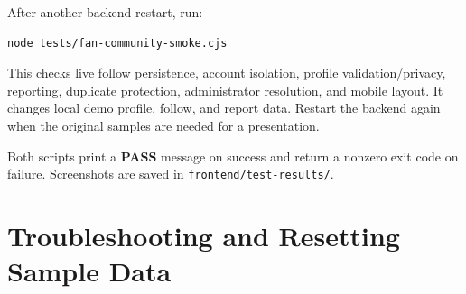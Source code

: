\documentclass[11pt]{report}
\begin{document}
After another backend restart, run:
\begin{samepage}
\begin{verbatim}
node tests/fan-community-smoke.cjs
\end{verbatim}
\end{samepage}
This checks live follow persistence, account isolation, profile validation/privacy, reporting, duplicate protection, administrator resolution, and mobile layout. It changes local demo profile, follow, and report data. Restart the backend again when the original samples are needed for a presentation.

Both scripts print a \textbf{PASS} message on success and return a nonzero exit code on failure. Screenshots are saved in \texttt{frontend/test-results/}.

\section{Troubleshooting and Resetting Sample Data}
\end{document}
